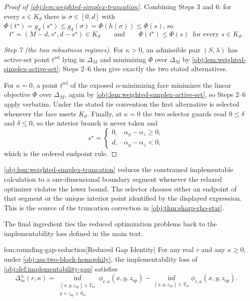 \documentclass[11pt]{article}
\begin{document}
\begin{proof}[Proof of \cref{obj:lem:weighted-simplex-truncation}]
Combining Steps 3 and 6: for every \(s\in K_d\) there is \(\sigma\in[0,d]\) with \(\Phi(t^\star)=g_d(s^\star)\le g_d(\sigma)=\Phi(h(\sigma))\le\Phi(s)\), so
\[
t^\star=(M-d,s^\star,d-s^\star)\in K_d
\qquad\text{and}\qquad
\Phi(t^\star)\le\Phi(s)\ \text{ for every }s\in K_d .
\]

\emph{Step 7 (the two robustness regimes).}  For \(\kappa>0\), an admissible pair \((S,\lambda)\) has active-set point \(t^{\mathrm{rel}}\) lying in \(\Delta_M\) and minimizing \(\Phi\) over \(\Delta_M\) by \cref{obj:lem:weighted-simplex-active-set}; Steps 2--6 then give exactly the two stated alternatives. %

For \(\kappa=0\), a point \(t^{\mathrm{rel}}\) of the exposed \(\alpha\)-minimizing face minimizes the linear objective \(\Phi\) over \(\Delta_M\), again by \cref{obj:lem:weighted-simplex-active-set}, so Steps 2--6 apply verbatim.  Under the stated tie convention the first alternative is selected whenever the face meets \(K_d\).  Finally, at \(\kappa=0\) the two selector guards read \(0\le\delta\) and \(\delta\le0\), so the interior branch is never taken and
\[
s^\star=\begin{cases}0,&\alpha_y-\alpha_z\ge0,\\ d,&\alpha_y-\alpha_z<0,\end{cases}
\]
which is the ordered endpoint rule. %
\end{proof}

\cref{obj:lem:weighted-simplex-truncation} reduces the constrained implementable calculation to a one-dimensional boundary segment whenever the relaxed optimizer violates the lower bound. The selector chooses either an endpoint of that segment or the unique interior point identified by the displayed expression. This is the source of the truncation correction in \cref{obj:thm:sharp-rho-star}.

The final ingredient ties the reduced optimization problems back to the implementability loss defined in the main text.

\begin{lemmav}{lem:rounding-gap-reduction}[Reduced Gap Identity]
For any real $r$ and any $\kappa\ge 0$, under \cref{obj:ass:two-block-homophily}, the implementability loss of \cref{obj:def:implementability-gap} satisfies
\[
\Delta_m^{\pm}(r,\kappa)
=
\inf_{\substack{(x,y,z_{\mathrm{sp}})\in T_m\\ y+z_{\mathrm{sp}}\ge d_m}}
\phi_{r,\kappa}(x,y,z_{\mathrm{sp}})
-
\inf_{(x,y,z_{\mathrm{sp}})\in T_m}
\phi_{r,\kappa}(x,y,z_{\mathrm{sp}}).
\]
\end{lemmav}
\end{document}
